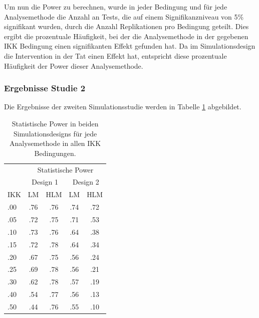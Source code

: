 \documentclass[12pt]{article}\usepackage[]{graphicx}\usepackage[]{color}
\begin{document}
Um nun die Power zu berechnen, wurde in jeder Bedingung und für jede Analysemethode die Anzahl an Tests, die auf einem Signifikanzniveau von 5\% signifikant wurden, durch die Anzahl Replikationen pro Bedingung geteilt. Dies ergibt die prozentuale Häufigkeit, bei der die Analysemethode in der gegebenen IKK Bedingung einen signifikanten Effekt gefunden hat. Da im Simulationsdesign die Intervention in der Tat einen Effekt hat, entspricht diese prozentuale Häufigkeit der Power dieser Analysemethode.

\subsubsection{Ergebnisse Studie 2}
Die Ergebnisse der zweiten Simulationsstudie werden in Tabelle \ref{tab:power_study2} abgebildet. 
\begin{table}[t!]
\centering
\setlength{\tabcolsep}{10pt}
\begin{threeparttable}
\caption{Statistische Power in beiden Simulationsdesigns für jede Analysemethode in allen IKK Bedingungen.}
\begin{tabular}{lcccc}
\toprule
	& \multicolumn{4}{c}{Statistische Power}\\
\cmidrule(lr){2-5}
	& \multicolumn{2}{c}{Design 1} & \multicolumn{2}{c}{Design 2} \\
\cmidrule(lr){2-3} \cmidrule(lr){4-5}
IKK & LM 	& HLM 	& LM 	& HLM \\ 
\midrule
.00 & .76 	& .76 	& .74 	& .72 \\ 
.05 & .72 	& .75 	& .71 	& .53 \\ 
.10 & .73 	& .76 	& .64 	& .38 \\ 
.15 & .72 	& .78 	& .64 	& .34 \\ 
.20 & .67 	& .75 	& .56 	& .24 \\ 
.25 & .69 	& .78 	& .56 	& .21 \\ 
.30 & .62 	& .78 	& .57 	& .19 \\ 
.40 & .54 	& .77 	& .56 	& .13 \\ 
.50 & .44 	& .76 	& .55 	& .10 \\ 
\bottomrule
\end{tabular}
\label{tab:power_study2}
\end{threeparttable}
\end{table}
\end{document}
